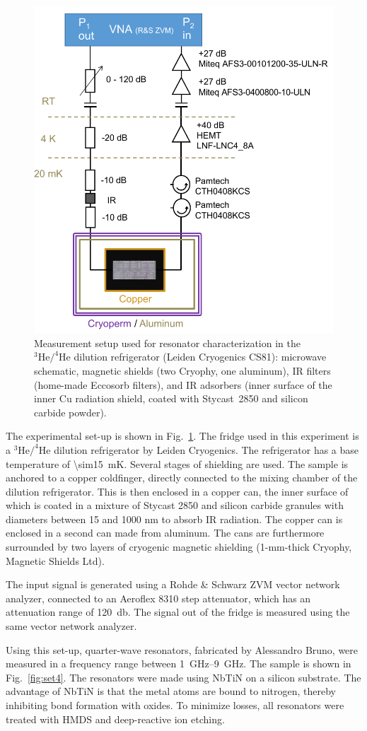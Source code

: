     \begin{figure}[!htb]
      \includegraphics[width=.5\textwidth]{Figures/DRIE/FigS2_MW_setup.pdf}
      \caption[width=\textwidth]{Measurement setup used for resonator characterization in the $^{3}\mathrm{He}/^{4}\mathrm{He}$ dilution refrigerator (Leiden Cryogenics CS81): microwave schematic, magnetic shields (two Cryophy, one aluminum), IR filters (home-made Eccosorb filters), and IR adsorbers (inner surface of the inner Cu radiation shield, coated with Stycast~2850 and silicon carbide powder).}
      \label{fig:fridges}
    \end{figure}
    The experimental set-up is shown in Fig.~\ref{fig:fridges}. The fridge used in this experiment is a $^{3}\mathrm{He}/^{4}\mathrm{He}$ dilution refrigerator by Leiden Cryogenics. The refrigerator has a base temperature of \SI{\sim15}{\milli \kelvin}. Several stages of shielding are used. The sample is anchored to a copper coldfinger, directly connected to the mixing chamber of the dilution refrigerator. This is then enclosed in a copper can, the inner surface of which is coated in a mixture of Stycast 2850 and silicon carbide granules with diameters between 15 and 1000 nm to absorb IR radiation. The copper can is enclosed in a second can made from aluminum. The cans are furthermore surrounded by two layers of cryogenic magnetic shielding (1-mm-thick Cryophy, Magnetic Shields Ltd).

    The input signal is generated using a Rohde \& Schwarz ZVM vector network analyzer, connected to an Aeroflex 8310 step attenuator, which has an attenuation range of \SI{120}{\decibel}. The signal out of the fridge is measured using the same vector network analyzer.

    Using this set-up, quarter-wave resonators, fabricated by Alessandro Bruno, were measured in a frequency range between \SIrange{1}{9}{\giga \hertz}. The sample is shown in Fig.~\ref{fig:set4}. The resonators were made using NbTiN on a silicon substrate. The advantage of NbTiN is that the metal atoms are bound to nitrogen, thereby inhibiting bond formation with oxides. To minimize losses, all resonators were treated with HMDS and deep-reactive ion etching.



